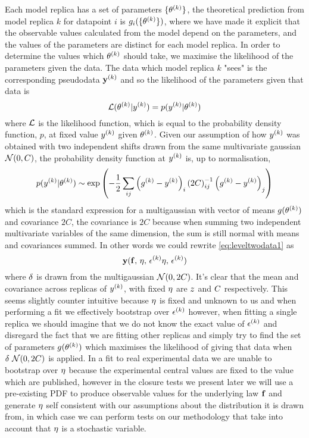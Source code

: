 Each model replica has a set of parameters $\{\theta^{(k)} \}$, the theoretical
prediction from model replica $k$ for datapoint $i$ is
$g_{i}(\{\theta^{(k)} \})$, where we have made it explicit that the observable
values calculated from the model depend on the parameters, and the values of the
parameters are distinct for each model replica. In order to determine the values
which $\theta^{(k)}$ should take, we maximise the likelihood of the parameters
given the data. The data which model replica $k$ "sees" is the corresponding
pseudodata $\mathbf{y}^{(k)}$ and so the likelihood of the parameters given
that data is
\begin{equation}
    \mathcal{L}(\theta^{(k)} \vert y^{(k)}) = p(y^{(k)} | \theta^{(k)})
\end{equation}
where $\mathcal{L}$ is the likelihood function, which is equal to the probability
density function, $p$, at fixed value $y^{(k)}$ given
$\theta^{(k)}$. Given our assumption of how $y^{(k)}$ was obtained
with two independent shifts drawn from the same multivariate gaussian
$\mathcal{N}(0, C)$, the probability density function at
$y^{(k)}$ is, up to normalisation,
\begin{equation}
    p(y^{(k)} | \theta^{(k)}) \sim
    \exp \left( - \frac{1}{2} \sum_{ij} \left( g^{(k)} - y^{(k)} \right)_i {(2C)}^{-1}_{ij} \left( g^{(k)} - y^{(k)} \right)_j \right)
\end{equation}
which is the standard expression for a multigaussian with vector of means
$g(\theta^{(k)})$ and covariance $2C$, the covariance is $2C$ because
when summing two independent multivariate variables of the same dimension, the
sum is still normal with means and covariances summed. In other words we could
rewrite \eqref{eq:leveltwodata1} as
\begin{equation}
    \mathbf{y}(\mathbf{f},\,\mathbf{\eta},\,\mathbf{\epsilon}^{(k)}\mathbf{\eta},\,\mathbf{\epsilon}^{(k)})
\end{equation}
where $\mathbf{\delta}$ is drawn from the multigaussian $\mathcal{N}(0, 2C)$.
It's clear that the mean and covariance
across replicas of $y^{(k)}$, with fixed $\eta$ are
$z$ and $C$ respectively. This seems slightly counter intuitive because
$\mathbf{\eta}$ is fixed and unknown to us and when performing a fit we effectively
bootstrap over $\mathbf{\epsilon}^{(k)}$ however,
when fitting a single replica we should imagine that
we do not know the exact value of $\epsilon^{(k)}$ and disregard the fact
that we are fitting other replicas and simply try to find the set of parameters
$g(\theta^{(k)})$ which maximises the likelihood of giving that data
when $\delta ~ \mathcal{N}(0, 2C)$ is applied. In a fit to real experimental
data we are unable to
bootstrap over $\mathbf{\eta}$ because the experimental central values are fixed
to the value which are published, however in the closure tests we present later
we will use a pre-existing PDF to produce observable values for the underlying
law $\mathbf{f}$ and generate $\mathbf{\eta}$ self consistent with our assumptions
about the distribution it is drawn from, in which case we can perform tests on
our methodology that take into account that $\mathbf{\eta}$ is a stochastic
variable.

